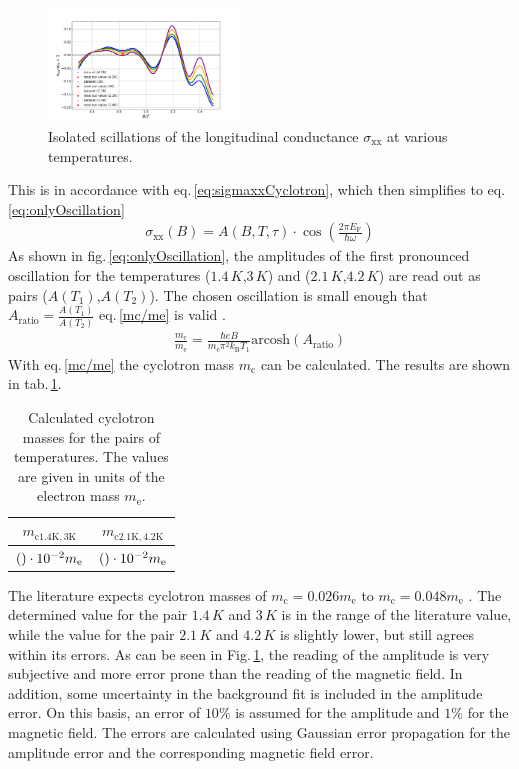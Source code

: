 \begin{figure}[h]
    \centering
    \includegraphics[width=0.45\textwidth]{../Images/reducedSigma.png}
    \caption{Isolated scillations of the longitudinal conductance $\sigma_\text{xx}$ at various temperatures.}
    \label{fig:oscillationsCyclotron}
\end{figure}
This is in accordance with eq.\,\ref{eq:sigmaxxCyclotron}, which then simplifies to eq.\,\ref{eq:onlyOscillation}
\begin{align}
    \sigma_\text{xx}(B) = A(B,T,\tau)\cdot\cos{\left(\frac{2\pi E_\text{F}}{\hbar\omega}\right)}
    \label{eq:onlyOscillation}
\end{align}
As shown in fig.\,\ref{eq:onlyOscillation}, the amplitudes of the first pronounced oscillation for the temperatures ($1.4\,K$,$3\,K$) and ($2.1\,K$,$4.2\,K$) are read out as pairs ($A(T_1)$,$A(T_2)$).
The chosen oscillation is small enough that $A_\text{ratio}=\frac{A(T_1)}{A(T_2)}$ eq.\,\ref{mc/me} is valid \cite{Tasksheet}.
\begin{align}
    \frac{m_\text{c}}{m_\text{e}}=\frac{\hbar eB}{m_\text{e}\pi^2k_\text{B}T_1}\text{arcosh}\left(A_\text{ratio}\right)\label{mc/me}
\end{align}
With eq.\,\ref{mc/me} the cyclotron mass $m_\text{c}$ can be calculated. The results are shown in tab.\,\ref{tab:cyclotronMass}.
\begin{table}[h]
    \centering
    \begin{tabular}{c|c}
        \hline\hline
        $m_{\text{c}1.4\text{K},3\text{K}}$ & $m_{\text{c}2.1\text{K},4.2\text{K}}$ \\\hline
        $(\csname cyclotron15\endcsname)\cdot 10^{-2}m_\text{e}$& $(\csname cyclotron21\endcsname)\cdot10^{-2}m_\text{e}$ \\
        \hline\hline
    \end{tabular}
    \caption{Calculated cyclotron masses for the pairs of temperatures. The values are given in units of the electron mass $m_\text{e}$. \label{tab:cyclotronMass}}
\end{table}
The literature expects cyclotron masses of $m_\text{c}= 0.026m_\text{e}$ to $m_\text{c}= 0.048m_\text{e}$ \cite{Xhang}.
The determined value for the pair $1.4\,K$ and $3\,K$ is in the range of the literature value, while the value for the pair $2.1\,K$ and $4.2\,K$ is slightly lower, but still agrees within its errors.
As can be seen in Fig.\,\ref{fig:oscillationsCyclotron}, the reading of the amplitude is very subjective and more error prone than the reading of the magnetic field.
In addition, some uncertainty in the background fit is included in the amplitude error.
On this basis, an error of $10\%$ is assumed for the amplitude and $1\%$ for the magnetic field.
The errors are calculated using Gaussian error propagation for the amplitude error and the corresponding magnetic field error.